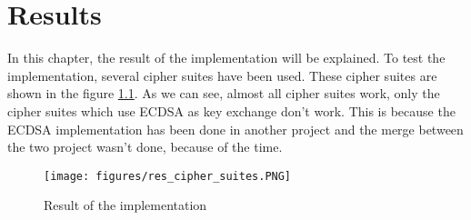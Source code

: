 \chapter{Results}

In this chapter, the result of the implementation will be explained.
To test the implementation, several cipher suites have been used. These cipher
suites are shown in the figure \ref{fig:res}.
As we can see, almost all cipher suites work, only the cipher suites which use
ECDSA as key exchange don't work. This is because the ECDSA implementation has
been done in another project and the merge between the two project wasn't
done, because of the time.

\begin{figure}[!ht]
\centering
\texttt{[image: figures/res\_cipher\_suites.PNG]}
\caption{Result of the implementation}
\label{fig:res}
\end{figure}